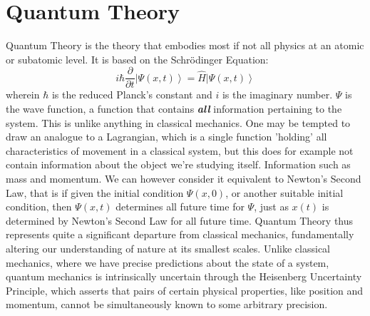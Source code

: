 \documentclass[12pt]{article}
\begin{document}
{\section{Quantum Theory}
Quantum Theory is the theory that embodies most if not all physics at an atomic or subatomic level. \newline
It is based on the Schrödinger Equation:
\begin{equation}
    i \hbar \frac{\partial}{\partial t} \left| \Psi(x, t) \right\rangle = \hat H \left| \Psi(x, t)\right\rangle
\end{equation}
wherein $\hbar$ is the reduced Planck's constant and $i$ is the imaginary number. \newline
$\Psi$ is the wave function, a function that contains \textbf{\textit{all}} information pertaining to the system. This is unlike anything in classical mechanics. One may be tempted to draw an analogue to a Lagrangian, which is a single function 'holding' all characteristics of movement in a classical system, but this does for example not contain information about the object we're studying itself. Information such as mass and momentum. We can however consider it equivalent to Newton's Second Law, that is if given the initial condition $\Psi(x, 0)$, or another suitable initial condition, then $\Psi(x, t)$ determines all future time for $\Psi$, just as $x(t)$ is determined by Newton's Second Law for all future time. \newline
Quantum Theory thus represents quite a significant departure from classical mechanics, fundamentally altering our understanding of nature at its smallest scales. Unlike classical mechanics, where we have precise predictions about the state of a system, quantum mechanics is intrinsically uncertain through the Heisenberg Uncertainty Principle, which asserts that pairs of certain physical properties, like position and momentum, cannot be simultaneously known to some arbitrary precision. \newline
\newpage
}
\end{document}

